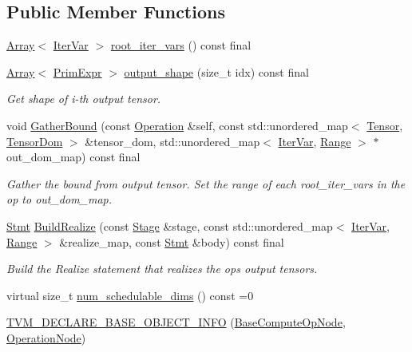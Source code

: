 \subsection*{Public Member Functions}
\begin{DoxyCompactItemize}
\item 
\hyperlink{classtvm_1_1Array}{Array}$<$ \hyperlink{classtvm_1_1tir_1_1IterVar}{Iter\+Var} $>$ \hyperlink{classtvm_1_1te_1_1BaseComputeOpNode_aab7b5b43122ee14bb00640906267361a}{root\+\_\+iter\+\_\+vars} () const final
\item 
\hyperlink{classtvm_1_1Array}{Array}$<$ \hyperlink{classtvm_1_1PrimExpr}{Prim\+Expr} $>$ \hyperlink{classtvm_1_1te_1_1BaseComputeOpNode_acdd22cc7c737d4dc8b6bf86d2f11a0db}{output\+\_\+shape} (size\+\_\+t idx) const final
\begin{DoxyCompactList}\small\item\em Get shape of i-\/th output tensor. \end{DoxyCompactList}\item 
void \hyperlink{classtvm_1_1te_1_1BaseComputeOpNode_ad8c5908da3677e4c628f22d3f50c6da1}{Gather\+Bound} (const \hyperlink{classtvm_1_1te_1_1Operation}{Operation} \&self, const std\+::unordered\+\_\+map$<$ \hyperlink{classtvm_1_1te_1_1Tensor}{Tensor}, \hyperlink{structtvm_1_1te_1_1TensorDom}{Tensor\+Dom} $>$ \&tensor\+\_\+dom, std\+::unordered\+\_\+map$<$ \hyperlink{classtvm_1_1tir_1_1IterVar}{Iter\+Var}, \hyperlink{classtvm_1_1Range}{Range} $>$ $\ast$out\+\_\+dom\+\_\+map) const final
\begin{DoxyCompactList}\small\item\em Gather the bound from output tensor. Set the range of each root\+\_\+iter\+\_\+vars in the op to out\+\_\+dom\+\_\+map. \end{DoxyCompactList}\item 
\hyperlink{classtvm_1_1tir_1_1Stmt}{Stmt} \hyperlink{classtvm_1_1te_1_1BaseComputeOpNode_a0bd84e898355eb941318af78245ca103}{Build\+Realize} (const \hyperlink{classtvm_1_1te_1_1Stage}{Stage} \&stage, const std\+::unordered\+\_\+map$<$ \hyperlink{classtvm_1_1tir_1_1IterVar}{Iter\+Var}, \hyperlink{classtvm_1_1Range}{Range} $>$ \&realize\+\_\+map, const \hyperlink{classtvm_1_1tir_1_1Stmt}{Stmt} \&body) const final
\begin{DoxyCompactList}\small\item\em Build the Realize statement that realizes the op\textquotesingle{}s output tensors. \end{DoxyCompactList}\item 
virtual size\+\_\+t \hyperlink{classtvm_1_1te_1_1BaseComputeOpNode_afff057b90df28567ab7b2ba19a05b17c}{num\+\_\+schedulable\+\_\+dims} () const =0
\item 
\hyperlink{classtvm_1_1te_1_1BaseComputeOpNode_ae942fa18ddac490a8b5022143b14cf11}{T\+V\+M\+\_\+\+D\+E\+C\+L\+A\+R\+E\+\_\+\+B\+A\+S\+E\+\_\+\+O\+B\+J\+E\+C\+T\+\_\+\+I\+N\+FO} (\hyperlink{classtvm_1_1te_1_1BaseComputeOpNode}{Base\+Compute\+Op\+Node}, \hyperlink{classtvm_1_1te_1_1OperationNode}{Operation\+Node})
\end{DoxyCompactItemize}
